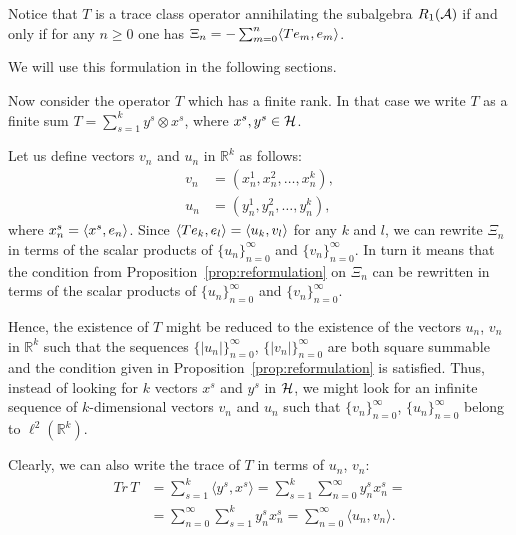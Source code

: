 \documentclass[12pt]{amsart}
\theoremstyle{case}
\begin{document}
  \begin{prop}
    \label{prop:reformulation}
    Notice that $T$ is a trace class operator annihilating the subalgebra $R_1(\cal{A})$ if and only if
      for any $n \geq 0$ one has $\Xi_n = -\sum_{m=0}^n \inner{Te_m}{e_m}$.
  \end{prop}
    We will use this formulation in the following sections.

  \medskip
  Now consider the operator $T$ which has a finite rank.
  In that case we write $T$ as a finite sum $T = \sum_{s=1}^k y^s \otimes x^s$,
    where $x^s, y^s \in \cal{H}$.

  Let us define vectors $v_n$ and $u_n$ in $\mathbb{R}^k$ as follows:
  \begin{align*}
    v_n &= (x^1_n, x^2_n, \dots, x^k_n),\\
    u_n &= (y^1_n, y^2_n, \dots, y^k_n),
  \end{align*}
  where $x^s_n = \inner{x^s}{e_n}$.
  Since $\inner{Te_k}{e_l} = \inner{u_k}{v_l}$ for any $k$ and $l$, we can rewrite $\Xi_n$ in terms of
    the scalar products of $\{u_n\}_{n=0}^\infty$ and $\{v_n\}_{n=0}^\infty$.
  In turn it means that the condition from Proposition~\ref{prop:reformulation} on $\Xi_n$
    can be rewritten in terms of the scalar products of $\{u_n\}_{n=0}^\infty$ and $\{v_n\}_{n=0}^\infty$.

  Hence, the existence of $T$ might be reduced to the existence of
    the vectors $u_n$, $v_n$ in $\mathbb{R}^k$ such that the sequences $\{\lvert u_n\rvert\}_{n=0}^\infty$,
    $\{\lvert v_n\rvert\}_{n=0}^\infty$ are both square summable and the condition given in Proposition~\ref{prop:reformulation} is satisfied.
  Thus, instead of looking for $k$ vectors $x^s$ and $y^s$ in $\cal{H}$, we might look for an infinite sequence
    of $k$-dimensional vectors $v_n$ and $u_n$ such that $\{v_n \}_{n=0}^\infty$, $\{u_n\}_{n=0}^\infty$ belong to $\ell^2(\mathbb{R}^k)$.

  Clearly, we can also write the trace of $T$ in terms of $u_n$, $v_n$:
  \begin{align*}
    Tr\,T &= \sum_{s=1}^k \langle y^s, x^s \rangle = \sum_{s=1}^k \sum_{n=0}^\infty y^s_n x^s_n =\\
         &= \sum_{n=0}^\infty \sum_{s=1}^k y^s_n x^s_n = \sum_{n=0}^\infty \langle u_n, v_n \rangle.
  \end{align*}
\end{document}
